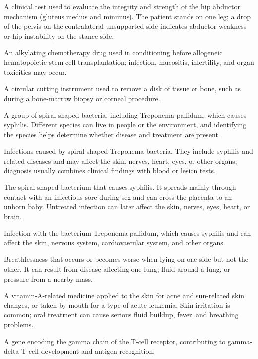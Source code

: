  A clinical test used to evaluate the integrity and strength of the hip abductor mechanism (gluteus medius and minimus). The patient stands on one leg; a drop of the pelvis on the contralateral unsupported side indicates abductor weakness or hip instability on the stance side.

 An alkylating chemotherapy drug used in conditioning before allogeneic hematopoietic stem-cell transplantation; infection, mucositis, infertility, and organ toxicities may occur.

 A circular cutting instrument used to remove a disk of tissue or bone, such as during a bone-marrow biopsy or corneal procedure.

 A group of spiral-shaped bacteria, including Treponema pallidum, which causes syphilis. Different species can live in people or the environment, and identifying the species helps determine whether disease and treatment are present.

 Infections caused by spiral-shaped Treponema bacteria. They include syphilis and related diseases and may affect the skin, nerves, heart, eyes, or other organs; diagnosis usually combines clinical findings with blood or lesion tests.

 The spiral-shaped bacterium that causes syphilis. It spreads mainly through contact with an infectious sore during sex and can cross the placenta to an unborn baby. Untreated infection can later affect the skin, nerves, eyes, heart, or brain.

 Infection with the bacterium Treponema pallidum, which causes syphilis and can affect the
skin, nervous system, cardiovascular system, and other organs.

 Breathlessness that occurs or becomes worse when lying on one side but not the other. It can result from disease affecting one lung, fluid around a lung, or pressure from a nearby mass.

 A vitamin-A-related medicine applied to the skin for acne and sun-related skin changes, or taken by mouth for a type of acute leukemia. Skin irritation is common; oral treatment can cause serious fluid buildup, fever, and breathing problems.

 A gene encoding the gamma chain of the T-cell receptor, contributing to gamma-delta T-cell development and antigen recognition.

